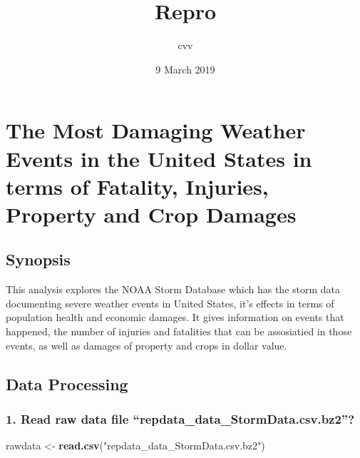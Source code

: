 \documentclass[]{article}
\title{Repro}
\author{cvv}
\date{9 March 2019}
\newenvironment{Shaded}{\begin{snugshade}}{\end{snugshade}}
\newcommand{\KeywordTok}[1]{\textcolor[rgb]{0.13,0.29,0.53}{\textbf{#1}}}
\newcommand{\StringTok}[1]{\textcolor[rgb]{0.31,0.60,0.02}{#1}}
\newcommand{\OperatorTok}[1]{\textcolor[rgb]{0.81,0.36,0.00}{\textbf{#1}}}
\newcommand{\NormalTok}[1]{#1}
\begin{document}
\maketitle

\section{The Most Damaging Weather Events in the United States in terms
of Fatality, Injuries, Property and Crop
Damages}\label{the-most-damaging-weather-events-in-the-united-states-in-terms-of-fatality-injuries-property-and-crop-damages}

\subsection{Synopsis}\label{synopsis}

This analysis explores the NOAA Storm Database which has the storm data
documenting severe weather events in United States, it's effects in
terms of population health and economic damages. It gives information on
events that happened, the number of injuries and fatalities that can be
assosiatied in those events, as well as damages of property and crops in
dollar value.

\subsection{Data Processing}\label{data-processing}

\subsubsection{\texorpdfstring{1. Read raw data file
``repdata\_data\_StormData.csv.bz2''?}{1. Read raw data file repdata\_data\_StormData.csv.bz2?}}\label{read-raw-data-file-repdata_data_stormdata.csv.bz2}

\begin{Shaded}
\begin{Highlighting}[]
\NormalTok{rawdata <-}\StringTok{ }\KeywordTok{read.csv}\NormalTok{(}\StringTok{"repdata_data_StormData.csv.bz2"}\NormalTok{)}
\end{Highlighting}
\end{Shaded}

\begin{Shaded}
\end{Shaded}
\end{document}

